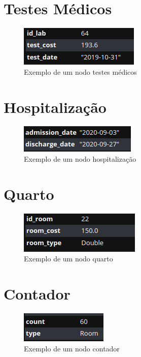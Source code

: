 \section{Testes Médicos}\label{secTestesMedicos}
\begin{figure}[H]
    \centering
    \includegraphics[width=0.3\linewidth]{Imagens/Neo4j/lab_screening.png}
    \caption{Exemplo de um nodo testes médicos}
    \label{fig:nodo_testes_medicos}
\end{figure}

\section{Hospitalização}\label{secHospitalizacao}
\begin{figure}[H]
    \centering
    \includegraphics[width=0.3\linewidth]{Imagens/Neo4j/hospitalization.png}
    \caption{Exemplo de um nodo hospitalização}
    \label{fig:nodo_hospitalizacao}
\end{figure}

\section{Quarto}\label{secQuarto}
\begin{figure}[H]
    \centering
    \includegraphics[width=0.3\linewidth]{Imagens/Neo4j/room.png}
    \caption{Exemplo de um nodo quarto}
    \label{fig:nodo_quarto}
\end{figure}

\section{Contador}\label{secContador}
\begin{figure}[H]
    \centering
    \includegraphics[width=0.3\linewidth]{Imagens/Neo4j/counter.png}
    \caption{Exemplo de um nodo contador}
    \label{fig:nodo_contador}
\end{figure}


